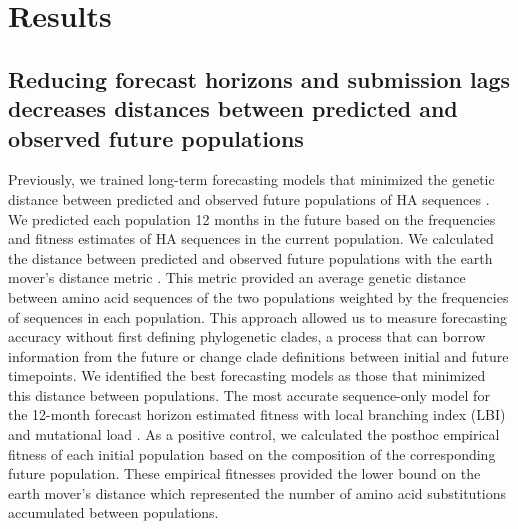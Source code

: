 \documentclass[9pt,lineno]{elife}
\begin{document}
\section{Results}

\subsection{Reducing forecast horizons and submission lags decreases distances between predicted and observed future populations}

Previously, we trained long-term forecasting models that minimized the genetic distance between predicted and observed future populations of HA sequences \citep{Huddleston2020}.
We predicted each population 12 months in the future based on the frequencies and fitness estimates of HA sequences in the current population.
We calculated the distance between predicted and observed future populations with the earth mover's distance metric \citep{Rubner1998}.
This metric provided an average genetic distance between amino acid sequences of the two populations weighted by the frequencies of sequences in each population.
This approach allowed us to measure forecasting accuracy without first defining phylogenetic clades, a process that can borrow information from the future or change clade definitions between initial and future timepoints.
We identified the best forecasting models as those that minimized this distance between populations.
The most accurate sequence-only model for the 12-month forecast horizon estimated fitness with local branching index (LBI) \citep{Neher:2014eu} and mutational load \citep{Luksza:2014hj}.
As a positive control, we calculated the posthoc empirical fitness of each initial population based on the composition of the corresponding future population.
These empirical fitnesses provided the lower bound on the earth mover's distance which represented the number of amino acid substitutions accumulated between populations.
\end{document}
